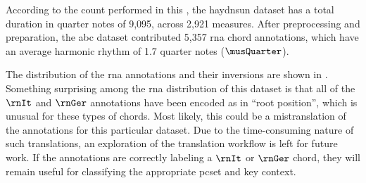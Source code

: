 
According to the count performed in this \thesisdiss{}, the
\gls{haydnsun} dataset has a total duration in quarter notes
of 9,095, across 2,921 measures. After preprocessing and
preparation, the \gls{abc} dataset contributed 5,357
\gls{rna} chord annotations, which have an average harmonic
rhythm of 1.7 quarter notes ($\musQuarter$).

The distribution of the \gls{rna} annotations and their
inversions are shown in .
Something surprising among the \gls{rna} distribution of
this dataset is that all of the $\rnIt$ and $\rnGer$
annotations have been encoded as in ``root position'', which
is unusual for these types of chords. Most likely, this
could be a mistranslation of the annotations for this
particular dataset. Due to the time-consuming nature of such
translations, an exploration of the translation workflow is
left for future work. If the annotations are correctly
labeling a $\rnIt$ or $\rnGer$ chord, they will remain
useful for classifying the appropriate \gls{pcset} and key
context.








